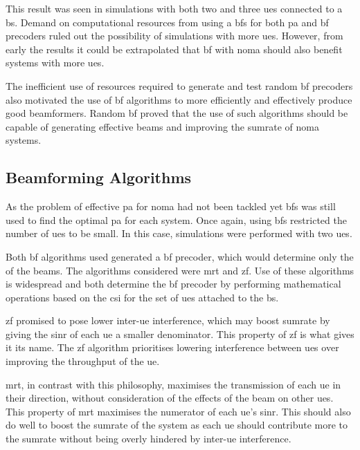 \par
This result was seen in simulations with both two and three \acp{ue} connected to a \ac{bs}.
Demand on computational resources from using a \ac{bfs} for both \ac{pa} and \ac{bf} precoders ruled out the possibility of simulations with more \acp{ue}.
However, from early the results it could be extrapolated that \ac{bf} with \ac{noma} should also benefit systems with more \acp{ue}.

\par
The inefficient use of resources required to generate and test random \ac{bf} precoders also motivated the use of \ac{bf} algorithms to more efficiently and effectively produce good beamformers.
Random \ac{bf} proved that the use of such algorithms should be capable of generating effective beams and improving the sumrate of \ac{noma} systems.

\subsection{Beamforming Algorithms}
As the problem of effective \ac{pa} for \ac{noma} had not been tackled yet \ac{bfs} was still used to find the optimal \ac{pa} for each system.
Once again, using \ac{bfs} restricted the number of \acp{ue} to be small.
In this case, simulations were performed with two \acp{ue}.

\par
Both \ac{bf} algorithms used generated a \ac{bf} precoder, which would determine only the of the beams.
The algorithms considered were \ac{mrt} and \ac{zf}.
Use of these algorithms is widespread and both determine the \ac{bf} precoder by performing mathematical operations based on the \ac{csi} for the set of \acp{ue} attached to the \ac{bs}.

\par
\ac{zf} promised to pose lower inter-\ac{ue} interference, which may boost sumrate by giving the \ac{sinr} of each \ac{ue} a smaller denominator.
This property of \ac{zf} is what gives it its name.
The \ac{zf} algorithm prioritises lowering interference between \acp{ue} over improving the throughput of the \ac{ue}.

\par
\ac{mrt}, in contrast with this philosophy, maximises the transmission of each \ac{ue} in their direction, without consideration of the effects of the beam on other \acp{ue}.
This property of \ac{mrt} maximises the numerator of each \ac{ue}'s \ac{sinr}.
This should also do well to boost the sumrate of the system as each \ac{ue} should contribute more to the sumrate without being overly hindered by inter-\ac{ue} interference.

